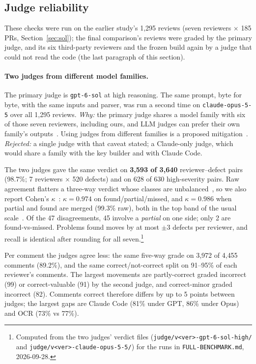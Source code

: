 \documentclass[11pt,a4paper]{article}
\newcommand{\code}[1]{\texttt{#1}}
\begin{document}
\subsection{Judge reliability}
\label{sec:judgestab}

These checks were run on the earlier study's 1{,}295 reviews (seven
reviewers $\times$ 185 PRs, Section~\ref{sec:sol}); the final comparison's
reviews were graded by the primary judge, and its six third-party reviewers
and the frozen build again by a judge that could not read the code (the last
paragraph of this section).

\paragraph{Two judges from different model families.} The primary judge is
\code{gpt-6-sol} at high reasoning. The same prompt, byte for byte, with the
same inputs and parser, was run a second time on \code{claude-opus-5-5}
over all 1{,}295 reviews. \emph{Why:} the primary judge shares a model family
with six of those seven reviewers, including ours, and LLM judges can prefer
their own family's outputs~\cite{panickssery2024,zheng2023}. Using judges
from different families is a proposed mitigation~\cite{verga2024}.
\emph{Rejected:} a single judge with that caveat stated; a Claude-only
judge, which would share a family with the key builder and with Claude Code.

The two judges gave the same verdict on \textbf{3{,}593 of 3{,}640}
reviewer--defect pairs (98.7\%; 7 reviewers $\times$ 520 defects) and on 628
of 630 high-severity pairs. Raw agreement flatters a three-way verdict whose
classes are unbalanced~\cite{feinstein1990}, so we also report Cohen's
$\kappa$~\cite{cohen1960}: $\kappa = 0.974$ on found/partial/missed, and
$\kappa = 0.986$ when partial and found are merged (99.3\% raw), both in the
top band of the usual scale~\cite{landis1977}. Of the 47 disagreements, 45
involve a \emph{partial} on one side; only 2 are found-vs-missed. Problems
found moves by at most $\pm3$ defects per reviewer, and recall is identical
after rounding for all seven.\footnote{Computed from the two judges' verdict
files (\code{judge/v<ver>-gpt-6-sol-high/} and
\code{judge/v<ver>-claude-opus-5-5/}) for the runs in
\code{FULL-BENCHMARK.md}, 2026-09-28.}

Per comment the judges agree less: the same five-way grade on 3{,}972 of
4{,}455 comments (89.2\%), and the same correct/not-correct split on 91--95\%
of each reviewer's comments. The largest movements are partly-correct
graded incorrect (99) or correct-valuable (91) by the second judge, and
correct-minor graded incorrect (82). Comments correct therefore differs by
up to 5 points between judges; the largest gaps are Claude Code (81\% under
GPT, 86\% under Opus) and OCR (73\% vs 77\%).
\end{document}
